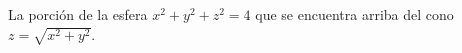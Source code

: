 \item La porción de la esfera $x^2 + y^2 + z^2 = 4$ que se encuentra arriba del cono $z = \sqrt{x^2 + y^2}$.
